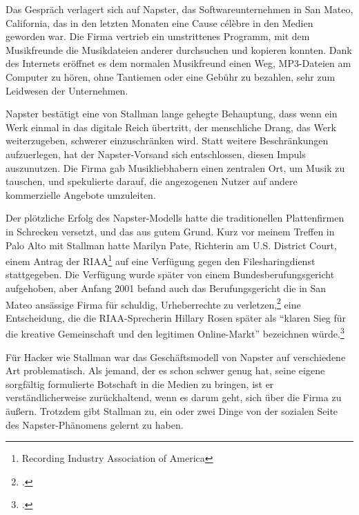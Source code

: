 Das Gespräch verlagert sich auf Napster, das Softwareunternehmen in San Mateo, California, das in den letzten Monaten eine Cause célèbre in den Medien geworden war. Die Firma vertrieb ein umstrittenes Programm, mit dem Musikfreunde die Musikdateien anderer durchsuchen und kopieren konnten. Dank des Internets eröffnet es dem normalen Musikfreund einen Weg, MP3-Dateien am Computer zu hören, ohne Tantiemen oder eine Gebühr zu bezahlen, sehr zum Leidwesen der Unternehmen.

Napster bestätigt eine von Stallman lange gehegte Behauptung, dass wenn ein Werk einmal in das digitale Reich übertritt, der menschliche Drang, das Werk weiterzugeben, schwerer einzuschränken wird. Statt weitere Beschränkungen aufzuerlegen, hat der Napster-Vorsand sich entschlossen, diesen Impuls auszunutzen. Die Firma gab Musikliebhabern einen zentralen Ort, um Musik zu tauschen, und spekulierte darauf, die angezogenen Nutzer auf andere kommerzielle Angebote umzuleiten.

Der plötzliche Erfolg des Napster-Modells hatte die traditionellen Plattenfirmen in Schrecken versetzt, und das aus gutem Grund. Kurz vor meinem Treffen in Palo Alto mit Stallman hatte Marilyn Pate, Richterin am U.S. District Court, einem Antrag der RIAA\footnote{Recording Industry Association of America} auf eine Verfügung gegen den Filesharingdienst stattgegeben. Die Verfügung wurde später von einem Bundesberufungsgericht aufgehoben, aber Anfang 2001 befand auch das Berufungsgericht die in San Mateo ansässige Firma für schuldig, Urheberrechte zu verletzen,\footcite[Vgl.][]{napinjunc} eine Entscheidung, die die RIAA-Sprecherin Hillary Rosen später als "`klaren Sieg für die kreative Gemeinschaft und den legitimen Online-Markt"' bezeichnen würde.\footcite[Vgl.][]{napstervictory}

Für Hacker wie Stallman war das Geschäftsmodell von Napster auf verschiedene Art problematisch. Als jemand, der es schon schwer genug hat, seine eigene sorgfältig formulierte Botschaft in die Medien zu bringen, ist er verständlicherweise zurückhaltend, wenn es darum geht, sich über die Firma zu äußern. Trotzdem gibt Stallman zu, ein oder zwei Dinge von der sozialen Seite des Napster-Phänomens gelernt zu haben.

